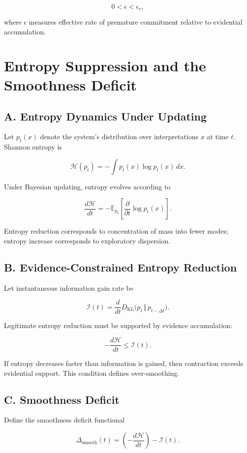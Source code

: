 \documentclass[11pt]{article}
\theoremstyle{remark}
\begin{document}
\[
0 < \epsilon < \epsilon_c,
\]

where $\epsilon$ measures effective rate of premature commitment relative to evidential accumulation.

\section{Entropy Suppression and the Smoothness Deficit}
\label{app:entropy}

\subsection*{A. Entropy Dynamics Under Updating}

Let $p_t(x)$ denote the system's distribution over interpretations $x$ at time $t$. Shannon entropy is

\[
\mathcal{H}(p_t)
=
- \int p_t(x) \log p_t(x)\, dx.
\]

Under Bayesian updating, entropy evolves according to

\[
\frac{d\mathcal{H}}{dt}
=
- \mathbb{E}_{p_t}
\left[
\frac{\partial}{\partial t} \log p_t(x)
\right].
\]

Entropy reduction corresponds to concentration of mass into fewer modes; entropy increase corresponds to exploratory dispersion.

\subsection*{B. Evidence-Constrained Entropy Reduction}

Let instantaneous information gain rate be

\[
\mathcal{I}(t)
=
\frac{d}{dt}
D_{\mathrm{KL}}\big(p_t \,\Vert\, p_{t-\Delta t}\big).
\]

Legitimate entropy reduction must be supported by evidence accumulation:

\[
- \frac{d\mathcal{H}}{dt}
\le
\mathcal{I}(t).
\]

If entropy decreases faster than information is gained, then contraction exceeds evidential support. This condition defines over-smoothing.

\subsection*{C. Smoothness Deficit}

Define the smoothness deficit functional

\[
\Delta_{\text{smooth}}(t)
=
\left(
- \frac{d\mathcal{H}}{dt}
\right)
-
\mathcal{I}(t).
\]
\end{document}
